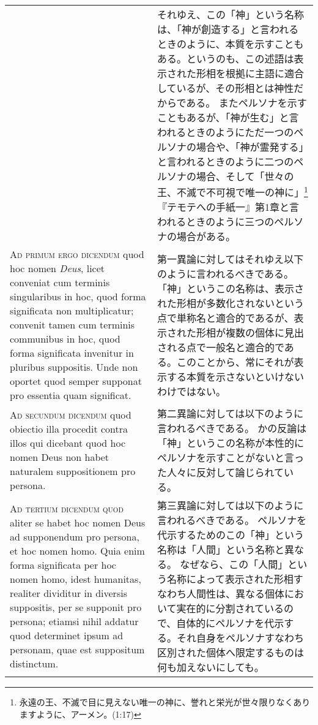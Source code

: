 \documentclass[10pt]{jsarticle} %
\begin{document}
\begin{longtable}{p{21em}p{21em}}
&

それゆえ、この「神」という名称は、「神が創造する」と言われるときのように、本質を示すこともある。というのも、この述語は表示された形相を根拠に主語に適合しているが、その形相とは神性だからである。
またペルソナを示すこともあるが、「神が生む」と言われるときのようにただ一つのペルソナの場合や、「神が霊発する」と言われるときのように二つのペルソナの場合、そして「世々の王、不滅で不可視で唯一の神に」\footnote{永遠の王、不滅で目に見えない唯一の神に、誉れと栄光が世々限りなくありますように、アーメン。(1:17)}『テモテへの手紙一』第1章と言われるときのように三つのペルソナの場合がある。

\\


\textsc{Ad primum ergo dicendum} quod hoc nomen \textit{Deus}, licet conveniat cum
terminis singularibus in hoc, quod forma significata non multiplicatur;
convenit tamen cum terminis communibus in hoc, quod forma significata
invenitur in pluribus suppositis. Unde non oportet quod semper supponat
pro essentia quam significat.

&

第一異論に対してはそれゆえ以下のように言われるべきである。
「神」というこの名称は、表示された形相が多数化されないという点で単称名と適合的であるが、表示された形相が複数の個体に見出される点で一般名と適合的である。このことから、常にそれが表示する本質を示さないといけないわけではない。

\\


\textsc{Ad secundum dicendum} quod obiectio illa procedit contra illos qui
dicebant quod hoc nomen Deus non habet naturalem suppositionem pro
persona.

&

第二異論に対しては以下のように言われるべきである。
かの反論は「神」というこの名称が本性的にペルソナを示すことがないと言った人々に反対して論じられている。
\\


\textsc{Ad tertium dicendum quod} aliter se habet hoc nomen Deus ad supponendum
pro persona, et hoc nomen homo. Quia enim forma significata per hoc
nomen homo, idest humanitas, realiter dividitur in diversis suppositis,
per se supponit pro persona; etiamsi nihil addatur quod determinet ipsum
ad personam, quae est suppositum distinctum. 



&

第三異論に対しては以下のように言われるべきである。
ペルソナを代示するためのこの「神」という名称は「人間」という名称と異なる。
なぜなら、この「人間」という名称によって表示された形相すなわち人間性は、異なる個体において実在的に分割されているので、自体的にペルソナを代示する。それ自身をペルソナすなわち区別された個体へ限定するものは何も加えないにしても。


\end{longtable}
\end{document}
